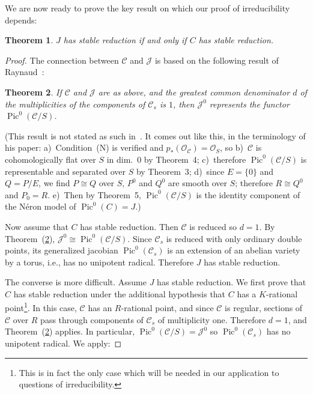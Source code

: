 \documentclass[10pt]{amsart}
\theoremstyle{plain}
\newtheorem{theorem}{Theorem}[section]
\theoremstyle{definition}
\DeclareMathOperator{\Pic}{Pic}
\newcommand{\cO}{\mathcal{O}}
\begin{document}
We are now ready to prove the key result on which our proof of irreducibility depends:

\begin{theorem}\label{thm:2.4}
$J$ has stable reduction if and only if $C$ has stable reduction.
\end{theorem}

\begin{proof}
The connection between $\mathscr{C}$ and $\mathscr{J}$ is based on the following result of Raynaud~\cite{R}:

\begin{theorem}\label{thm:2.5}
If $\mathscr{C}$ and $\mathscr{J}$ are as above, and the greatest common denominator $d$ of the multiplicities of the components of $\mathscr{C}_s$ is $1$, then $\mathscr{J}^0$ represents the functor $\Pic^0(\mathscr{C}/S)$.
\end{theorem}

(This result is not stated as such in~\cite{R}. It comes out like this, in the terminology of his paper: a)~Condition~(N) is verified and $p_*(\cO_{\mathscr{C}}) = \cO_S$, so b)~$\mathscr{C}$ is cohomologically flat over $S$ in dim.~$0$ by Theorem~4; c)~therefore $\Pic^0(\mathscr{C}/S)$ is representable and separated over $S$ by Theorem~3; d)~since $E = \{0\}$ and $Q = P/E$, we find $P \cong Q$ over $S$, $P^0$ and $Q^0$ are smooth over $S$; therefore $R \cong Q^0$ and $P_0 = R$. e)~Then by Theorem~5, $\Pic^0(\mathscr{C}/S)$ is the identity component of the N\'eron model of $\Pic^0(C) = J$.)

Now assume that $C$ has stable reduction. Then $\mathscr{C}$ is reduced so $d = 1$. By Theorem~(\ref{thm:2.5}), $\mathscr{J}^0 \cong \Pic^0(\mathscr{C}/S)$. Since $\mathscr{C}_s$ is reduced with only ordinary double points, its generalized jacobian $\Pic^0(\mathscr{C}_s)$ is an extension of an abelian variety by a torus, i.e., has no unipotent radical. Therefore $J$ has stable reduction.

The converse is more difficult. Assume $J$ has stable reduction. We first prove that $C$ has stable reduction under the additional hypothesis that $C$ has a $K$-rational point\footnote{This is in fact the only case which will be needed in our application to questions of irreducibility.}. In this case, $\mathscr{C}$ has an $R$-rational point, and since $\mathscr{C}$ is regular, sections of $\mathscr{C}$ over $R$ pass through components of $\mathscr{C}_s$ of multiplicity one. Therefore $d = 1$, and Theorem~(\ref{thm:2.5}) applies. In particular, $\Pic^0(\mathscr{C}/S) = \mathscr{J}^0$ so $\Pic^0(\mathscr{C}_s)$ has no unipotent radical. We apply:


\end{proof}
\end{document}
